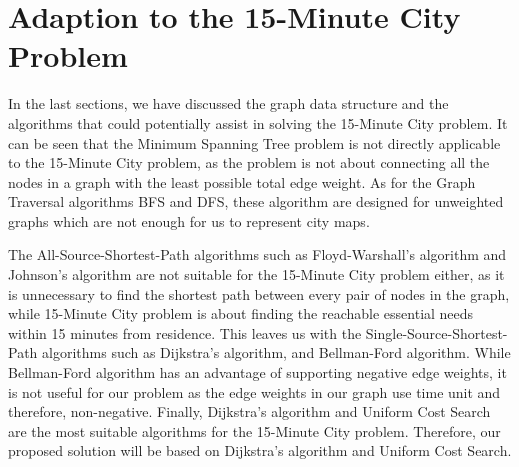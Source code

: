 \section{Adaption to the 15-Minute City Problem}

In the last sections, we have discussed the graph data structure and the algorithms that could potentially assist in solving the 15-Minute City problem. It can be seen that the Minimum Spanning Tree problem is not directly applicable to the 15-Minute City problem, as the problem is not about connecting all the nodes in a graph with the least possible total edge weight. As for the Graph Traversal algorithms BFS and DFS, these algorithm are designed for unweighted graphs which are not enough for us to represent city maps.

The All-Source-Shortest-Path algorithms such as Floyd-Warshall's algorithm and Johnson's algorithm are not suitable for the 15-Minute City problem either, as it is unnecessary to find the shortest path between every pair of nodes in the graph, while 15-Minute City problem is about finding the reachable essential needs within 15 minutes from residence. This leaves us with the Single-Source-Shortest-Path algorithms such as Dijkstra's algorithm, and Bellman-Ford algorithm. While Bellman-Ford algorithm has an advantage of supporting negative edge weights, it is not useful for our problem as the edge weights in our graph use time unit and therefore, non-negative. Finally, Dijkstra's algorithm and Uniform Cost Search are the most suitable algorithms for the 15-Minute City problem. Therefore, our proposed solution will be based on Dijkstra's algorithm and Uniform Cost Search.